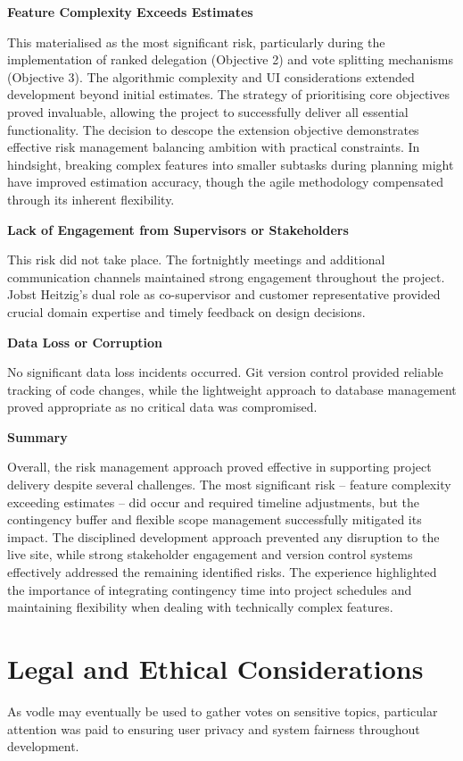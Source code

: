 \textbf{Feature Complexity Exceeds Estimates}

This materialised as the most significant risk, particularly during the implementation of ranked delegation (Objective 2) and vote splitting mechanisms (Objective 3). The algorithmic complexity and UI considerations extended development beyond initial estimates.
The strategy of prioritising core objectives proved invaluable, allowing the project to successfully deliver all essential functionality. The decision to descope the extension objective demonstrates effective risk management balancing ambition with practical constraints.
In hindsight, breaking complex features into smaller subtasks during planning might have improved estimation accuracy, though the agile methodology compensated through its inherent flexibility.

\textbf{Lack of Engagement from Supervisors or Stakeholders}

This risk did not take place. The fortnightly meetings and additional communication channels maintained strong engagement throughout the project. Jobst Heitzig's dual role as co-supervisor and customer representative provided crucial domain expertise and timely feedback on design decisions.

\textbf{Data Loss or Corruption}

No significant data loss incidents occurred. Git version control provided reliable tracking of code changes, while the lightweight approach to database management proved appropriate as no critical data was compromised.

\textbf{Summary}

Overall, the risk management approach proved effective in supporting project delivery despite several challenges. The most significant risk -- feature complexity exceeding estimates -- did occur and required timeline adjustments, but the contingency buffer and flexible scope management successfully mitigated its impact. The disciplined development approach prevented any disruption to the live site, while strong stakeholder engagement and version control systems effectively addressed the remaining identified risks. The experience highlighted the importance of integrating contingency time into project schedules and maintaining flexibility when dealing with technically complex features.

\section{Legal and Ethical Considerations}
As vodle may eventually be used to gather votes on sensitive topics, particular attention was paid to ensuring user privacy and system fairness throughout development.

